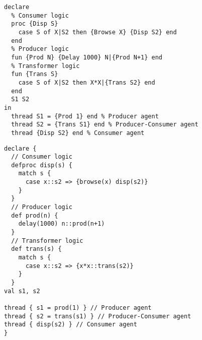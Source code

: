 \begin{lstlisting}[language=oz,label={lst:lstexampleagentsoz},title={Pipeline : a concurrent program example (\textit{Oz} version)}]
declare
  % Consumer logic
  proc {Disp S}
    case S of X|S2 then {Browse X} {Disp S2} end
  end
  % Producer logic
  fun {Prod N} {Delay 1000} N|{Prod N+1} end
  % Transformer logic
  fun {Trans S}
    case S of X|S2 then X*X|{Trans S2} end
  end
  S1 S2
in
  thread S1 = {Prod 1} end % Producer agent
  thread S2 = {Trans S1} end % Producer-Consumer agent
  thread {Disp S2} end % Consumer agent
\end{lstlisting}
\begin{lstlisting}[language=newoz,label={lst:lstexampleagentsnewoz},title={Pipeline : a concurrent program example (\textit{NewOz} version)}]
declare {
  // Consumer logic
  defproc disp(s) {
    match s {
      case x::s2 => {browse(x) disp(s2)}
    }
  }
  // Producer logic
  def prod(n) {
    delay(1000) n::prod(n+1)
  }
  // Transformer logic
  def trans(s) {
    match s {
      case x::s2 => {x*x::trans(s2)}
    }
  }
val s1, s2

thread { s1 = prod(1) } // Producer agent
thread { s2 = trans(s1) } // Producer-Consumer agent
thread { disp(s2) } // Consumer agent
}
\end{lstlisting}
